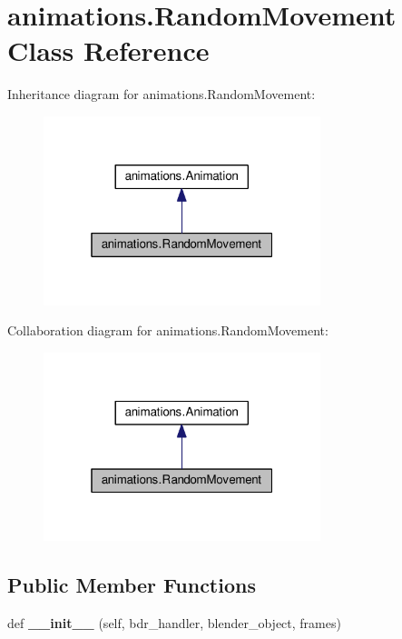 \hypertarget{classanimations_1_1RandomMovement}{}\section{animations.\+Random\+Movement Class Reference}
\label{classanimations_1_1RandomMovement}


Inheritance diagram for animations.\+Random\+Movement\+:\nopagebreak
\begin{figure}[H]
\begin{center}
\leavevmode
\includegraphics[width=229pt]{classanimations_1_1RandomMovement__inherit__graph}
\end{center}
\end{figure}


Collaboration diagram for animations.\+Random\+Movement\+:\nopagebreak
\begin{figure}[H]
\begin{center}
\leavevmode
\includegraphics[width=229pt]{classanimations_1_1RandomMovement__coll__graph}
\end{center}
\end{figure}
\subsection*{Public Member Functions}
\begin{DoxyCompactItemize}
\item 
def {\bfseries \+\_\+\+\_\+init\+\_\+\+\_\+} (self, bdr\+\_\+handler, blender\+\_\+object, frames)\hypertarget{classanimations_1_1RandomMovement_ada9f89f50af67ffcd5c073a5e0672a20}{}\label{classanimations_1_1RandomMovement_ada9f89f50af67ffcd5c073a5e0672a20}

\end{DoxyCompactItemize}
